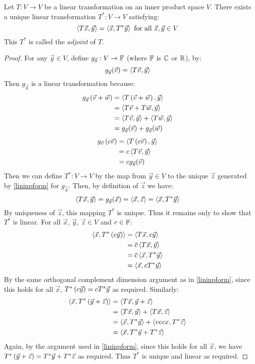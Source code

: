 \begin{theorem}
  Let $T : V \to V$ be a linear transformation on an inner product space $V$.
  There exists a unique linear transformation $T^* : V \to V$ satisfying:
    $$\left\langle T\vec x , \vec y \right\rangle = \left\langle \vec x , T^*\vec y \right\rangle \text{ for all } \vec x, \vec y \in V$$
  This $T^*$ is called the \emph{adjoint} of $T$.
\end{theorem}
\begin{proof}
  For any $\vec y \in V$, define $g_{\vec y} : V \to \mathbb{F}$ (where $\mathbb{F}$ is $\mathbb{C}$ or $\mathbb{R}$), by:
  $$g_{\vec y}(\vec v) = \left\langle T\vec v , \vec y \right\rangle$$
  Then $g_{\vec y}$ is a linear transformation because:
  \begin{align}
    g_{\vec y}\left(\vec v + \vec w\right)
      &= \left\langle T\left(\vec v + \vec w\right) , \vec y \right\rangle \\
      &= \left\langle T\vec v + T\vec w , \vec y \right\rangle \\
      &= \left\langle T\vec v , \vec y \right\rangle + \left\langle T\vec w , \vec y \right\rangle \\
      &= g_{\vec y}(\vec v) + g_{\vec y}(\vec w)
  \end{align}
  \begin{align}
    g_{\vec v}\left(c \vec v\right)
      &= \left\langle T\left(c \vec v\right) , \vec y \right\rangle \\
      &= c\left\langle T\vec v , \vec y \right\rangle \\
      &= cg_{\vec y}(\vec v)
  \end{align}
  Then we can define $T^* : V \to V$ by the map from $\vec y \in V$ to the unique $\vec z$ generated by \ref{lininpform} for $g_{\vec y}$.
  Then, by definition of $\vec z$ we have:
  $$\left\langle T \vec x , \vec y \right\rangle = g_{\vec y}(\vec x) = \left\langle \vec x , \vec z \right\rangle = \left\langle \vec x , T^*\vec y \right\rangle$$
  By uniqueness of $\vec z$, this mapping $T^*$ is unique. Thus it remains only to show that $T^*$ is linear.
  For all $\vec x$, $\vec y$, $\vec z \in V$ and $c \in \mathbb{F}$:
  \begin{align}
    \left\langle \vec x , T^*\left(c \vec y\right) \right\rangle
      &= \left\langle T\vec x , c \vec y \right\rangle \\
      &= \overline{c}\left\langle T \vec x , \vec y \right\rangle \\
      &= \overline{c}\left\langle \vec x , T^* \vec y \right\rangle \\
      &= \left\langle \vec x , c T^* \vec y \right\rangle
  \end{align}
  By the same orthogonal complement dimension argument as in \ref{lininpform}, since this holds for all $\vec x$, $T^*\left(c \vec y\right) = cT^* \vec y$ as required. Similarly:
  \begin{align}
    \left\langle \vec x , T^*\left(\vec y + \vec z\right) \right\rangle
      &= \left\langle T\vec x , \vec y + \vec z \right\rangle \\
      &= \left\langle T\vec x , \vec y \right\rangle + \left\langle T\vec x , \vec z \right\rangle \\
      &= \left\langle \vec x , T^* \vec y \right\rangle + \left\langle vec x , T^* \vec z \right\rangle \\
      &= \left\langle \vec x , T^* \vec y + T^* \vec z \right\rangle
  \end{align}
  Again, by the argument used in \ref{lininpform}, since this holds for all $\vec x$, we have $T^*\left(\vec y + \vec z\right) = T^*\vec y + T^*\vec z$ as required.
  Thus $T^*$ is unique and linear as required.
\end{proof}

